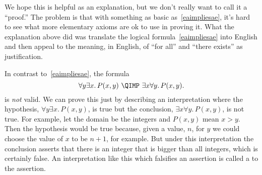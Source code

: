 We hope this is helpful as an explanation, but we don't really want to
call it a ``proof.''  The problem is that with something as basic
as~\eqref{eaimpliesae}, it's hard to see what more elementary axioms
are ok to use in proving it.  What the explanation above did was
translate the logical formula~\eqref{eaimpliesae} into English and
then appeal to the meaning, in English, of ``for all'' and ``there
exists'' as justification.

\iffalse
So this wasn't a proof, just an explanation intended to make 
what~\eqref{eaimpliesae} means, it becomes obvious.
\fi

In contrast to~\eqref{eaimpliesae}, the formula
\begin{equation}\label{aenotimplyea}
\forall y \exists x.\, P(x,y)\ \QIMP\ \exists x \forall y.\, P(x,y).
\end{equation}
is \emph{not} valid.  We can prove this just by describing an
interpretation where the hypothesis, $\forall y \exists x.\, P(x,y)$, is
true but the conclusion, $\exists x \forall y.\, P(x,y)$, is not true.
For example, let the domain be the integers and $P(x,y)$ mean $x > y$.
Then the hypothesis would be true because, given a value, $n$, for $y$ we
could choose the value of $x$ to be $n+1$, for example.  But under this
interpretation the conclusion asserts that there is an integer that is
bigger than all integers, which is certainly false.  An interpretation
like this which falsifies an assertion is called a  to
the assertion.

\begin{problems}
\classproblems
{}
\homeworkproblems
{}
\end{problems}

\endinput
